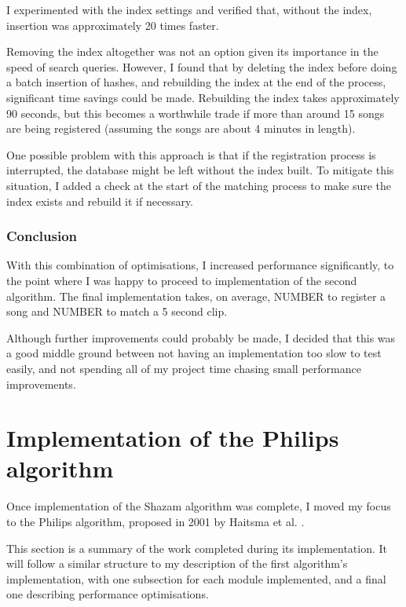\documentclass[12pt,a4paper,twoside,openright]{report}
\begin{document}
I experimented with the index settings and verified that, without the index, insertion was approximately 20 times faster.

Removing the index altogether was not an option given its importance in the speed of search queries. However, I found that by deleting the index before doing a batch insertion of hashes, and rebuilding the index at the end of the process, significant time savings could be made. Rebuilding the index takes approximately 90 seconds, but this becomes a worthwhile trade if more than around 15 songs are being registered (assuming the songs are about 4 minutes in length).

One possible problem with this approach is that if the registration process is interrupted, the database might be left without the index built. To mitigate this situation, I added a check at the start of the matching process to make sure the index exists and rebuild it if necessary.

\subsubsection{Conclusion}

With this combination of optimisations, I increased performance significantly, to the point where I was happy to proceed to implementation of the second algorithm. The final implementation takes, on average, NUMBER to register a song and NUMBER to match a 5 second clip. %

Although further improvements could probably be made, I decided that this was a good middle ground between not having an implementation too slow to test easily, and not spending all of my project time chasing small performance improvements.



\section{Implementation of the Philips algorithm}
\label{section:philips}

Once implementation of the Shazam algorithm was complete, I moved my focus to the Philips algorithm, proposed in 2001 by Haitsma et al. \cite{Haitsma02}. 

This section is a summary of the work completed during its implementation. It will follow a similar structure to my description of the first algorithm's implementation, with one subsection for each module implemented, and a final one describing performance optimisations.
\end{document}
